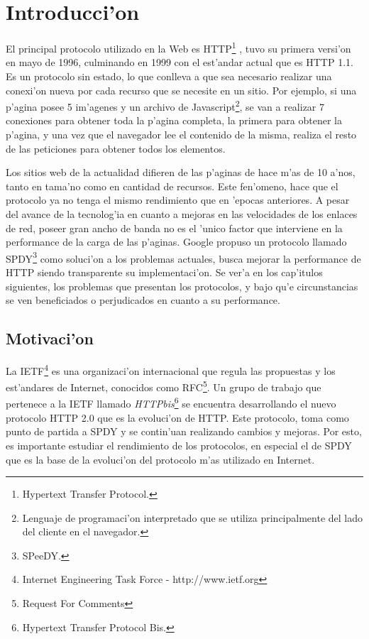 \chapter{Introducci'on}

El principal protocolo utilizado en la Web es HTTP\footnote{Hypertext Transfer Protocol.} \citep{rfcHTTP1.1}, tuvo su primera versi'on en mayo de 1996, culminando en 1999 con el est'andar actual que es HTTP 1.1. Es un protocolo sin estado, lo que conlleva a que sea necesario realizar una conexi'on nueva por cada recurso que se necesite en un sitio. Por ejemplo, si una p'agina posee 5 im'agenes y un archivo de Javascript\footnote{Lenguaje de programaci'on interpretado que se utiliza principalmente del lado del cliente en el navegador.}, se van a realizar 7 conexiones para obtener toda la p'agina completa, la primera para obtener la p'agina, y una vez que el navegador lee el contenido de la misma, realiza el resto de las peticiones para obtener todos los elementos.

Los sitios web de la actualidad difieren de las p'aginas de hace m'as de 10 a'nos, tanto en tama'no como en cantidad de recursos. Este fen'omeno, hace que el protocolo ya no tenga el mismo rendimiento que en 'epocas anteriores. A pesar del avance de la tecnolog'ia en cuanto a mejoras en las velocidades de los enlaces de red, poseer gran ancho de banda no es el 'unico factor que interviene en la performance de la carga de las p'aginas.
Google propuso un protocolo llamado SPDY\footnote{SPeeDY.} como soluci'on a los problemas actuales, busca mejorar la performance de HTTP siendo transparente su implementaci'on.
Se ver'a en los cap'itulos siguientes, los problemas que presentan los protocolos, y bajo qu'e circunstancias se ven beneficiados o perjudicados en cuanto a su performance.

\section{Motivaci'on}

La IETF\footnote{Internet Engineering Task Force - http://www.ietf.org} es una organizaci'on internacional que regula las propuestas y los est'andares de Internet, conocidos como RFC\footnote{Request For Comments}. Un grupo de trabajo que pertenece a la IETF llamado \textit{HTTPbis}\footnote{Hypertext Transfer Protocol Bis.} se encuentra desarrollando el nuevo protocolo HTTP 2.0 \citep{http2} que es la evoluci'on de HTTP. Este protocolo, toma como punto de partida a SPDY y se contin'uan realizando cambios y mejoras. Por esto, es importante estudiar el rendimiento de los protocolos, en especial el de SPDY que es la base de la evoluci'on del protocolo m'as utilizado en Internet.

